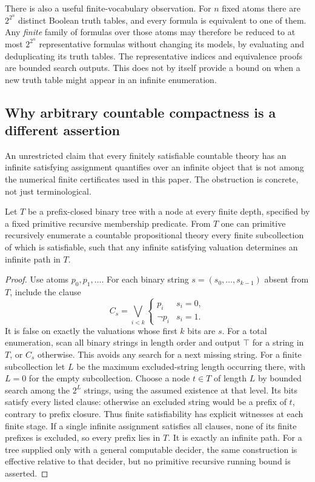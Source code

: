 There is also a useful finite-vocabulary observation. For $n$ fixed atoms
there are $2^{2^n}$ distinct Boolean truth tables, and every formula is
equivalent to one of them. Any \emph{finite} family of formulas over those
atoms may therefore be reduced to at most $2^{2^n}$ representative formulas
without changing its models, by evaluating and deduplicating its truth
tables. The representative indices and equivalence proofs are bounded
search outputs. This does not by itself provide a bound on when a new
truth table might appear in an infinite enumeration.

\subsection{Why arbitrary countable compactness is a different assertion}

An unrestricted claim that every finitely satisfiable countable theory has
an infinite satisfying assignment quantifies over an infinite object that
is not among the numerical finite certificates used in this paper. The
obstruction is concrete, not just terminological.

\begin{proposition}
\label{thm:compactness-tree}
Let $T$ be a prefix-closed binary tree with a node at every finite depth,
specified by a fixed primitive recursive membership predicate. From $T$
one can primitive recursively enumerate a countable propositional
theory every finite subcollection of which is satisfiable, such that any
infinite satisfying valuation determines an infinite path in $T$.
\end{proposition}
\begin{proof}
Use atoms $p_0,p_1,\ldots$. For each binary string
$s=(s_0,\ldots,s_{k-1})$ absent from $T$, include the clause
\[
 C_s=\bigvee_{i<k}\begin{cases}p_i&s_i=0,\\\neg p_i&s_i=1.\end{cases}
\]
It is false on exactly the valuations whose first $k$ bits are $s$.
For a total enumeration, scan all binary strings in length order and output
$\top$ for a string in $T$, or $C_s$ otherwise. This avoids any search for
a next missing string. For a finite subcollection let $L$ be the maximum
excluded-string length occurring there, with $L=0$ for the empty
subcollection. Choose a node $t\in T$ of length $L$ by bounded search among the
$2^L$ strings, using the assumed existence at that level. Its bits satisfy
every listed clause: otherwise an excluded string would be a prefix of
$t$, contrary to prefix closure. Thus finite satisfiability has explicit
witnesses at each finite stage. If a single infinite assignment satisfies
all clauses, none of its finite prefixes is excluded, so every prefix lies
in $T$. It is exactly an infinite path. For a tree supplied only with a
general computable decider, the same construction is effective relative
to that decider, but no primitive recursive running bound is asserted.
\end{proof}

